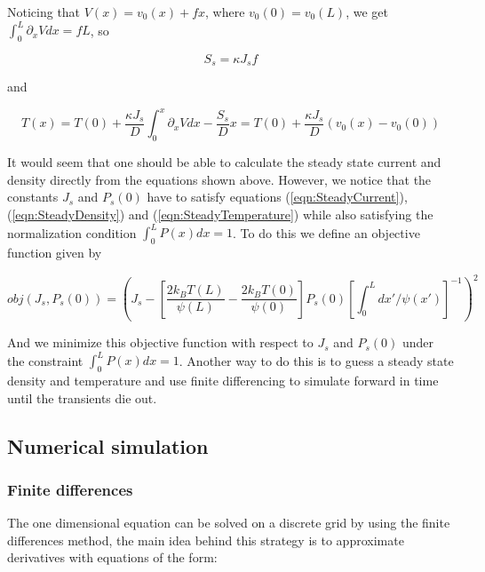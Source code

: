 \documentclass[11pt]{article} %
\begin{document}
Noticing that $V(x) = v_0(x) + f x$, where $v_0(0) = v_0(L)$, we get $\int_0^L \partial_x V dx = f L$, so

\begin{equation}
S_s = \kappa J_s f
\end{equation}

and

\begin{equation}
T(x) = T(0) + \frac{\kappa J_s}{D} \int_0^x \partial_x V dx - \frac{S_s}{D}x = T(0) + \frac{\kappa J_s}{D} (v_0(x) - v_0(0)) \label{eqn:SteadyTemperature}
\end{equation}

It would seem that one should be able to calculate the steady state current and density directly from the equations shown above. However, we notice that the constants $J_s$ and $P_s(0)$ have to satisfy equations (\ref{eqn:SteadyCurrent}), (\ref{eqn:SteadyDensity}) and (\ref{eqn:SteadyTemperature}) while also satisfying the normalization condition $\int_0^L P(x) dx = 1$. To do this we define an objective function given by

\begin{equation}
obj(J_s, P_s(0)) = \left (J_s - \left [\frac{2 k_B T(L)}{\psi(L)} - \frac{2 k_B T(0)}{\psi(0)}  \right] P_s(0) \left [\int_0^L dx'/\psi(x') \right]^{-1} \right)^2  \label{eqn:Objective}
\end{equation}

And we minimize this objective function with respect to $J_s$ and $P_s(0)$ under the constraint $\int_0^L P(x) dx = 1$. Another way to do this is to guess a steady state density and temperature and use finite differencing to simulate forward in time until the transients die out.


\subsection{Numerical simulation} \label{numerics}

\subsubsection{Finite differences}
The one dimensional equation can be solved on a discrete grid by using the finite differences method, the main idea behind this strategy is to approximate derivatives with equations of the form:
\end{document}
